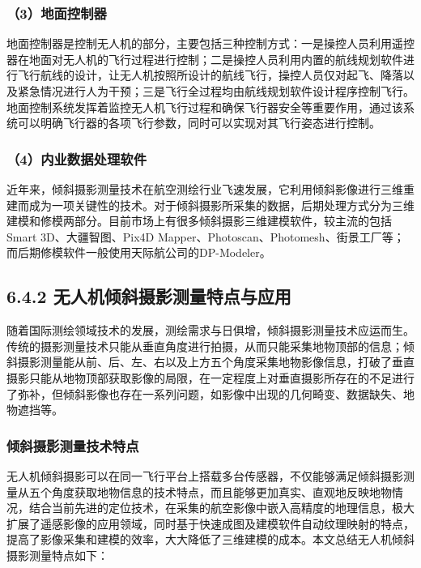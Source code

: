 \subsubsection{（3）地面控制器}\label{ux5730ux9762ux63a7ux5236ux5668}

地面控制器是控制无人机的部分，主要包括三种控制方式：一是操控人员利用遥控器在地面对无人机的飞行过程进行控制；二是操控人员利用内置的航线规划软件进行飞行航线的设计，让无人机按照所设计的航线飞行，操控人员仅对起飞、降落以及紧急情况进行人为干预；三是飞行全过程均由航线规划软件设计程序控制飞行。地面控制系统发挥着监控无人机飞行过程和确保飞行器安全等重要作用，通过该系统可以明确飞行器的各项飞行参数，同时可以实现对其飞行姿态进行控制。

\subsubsection{（4）内业数据处理软件}\label{ux5185ux4e1aux6570ux636eux5904ux7406ux8f6fux4ef6}

近年来，倾斜摄影测量技术在航空测绘行业飞速发展，它利用倾斜影像进行三维重建而成为一项关键性的技术。对于倾斜摄影所采集的数据，后期处理方式分为三维建模和修模两部分。目前市场上有很多倾斜摄影三维建模软件，较主流的包括Smart
3D、大疆智图、Pix4D
Mapper、Photoscan、Photomesh、街景工厂等；而后期修模软件一般使用天际航公司的DP-Modeler。

\subsection{6.4.2
无人机倾斜摄影测量特点与应用}\label{ux65e0ux4ebaux673aux503eux659cux6444ux5f71ux6d4bux91cfux7279ux70b9ux4e0eux5e94ux7528}

随着国际测绘领域技术的发展，测绘需求与日俱增，倾斜摄影测量技术应运而生。传统的摄影测量技术只能从垂直角度进行拍摄，从而只能采集地物顶部的信息；倾斜摄影测量能从前、后、左、右以及上方五个角度采集地物影像信息，打破了垂直摄影只能从地物顶部获取影像的局限，在一定程度上对垂直摄影所存在的不足进行了弥补，但倾斜影像也存在一系列问题，如影像中出现的几何畸变、数据缺失、地物遮挡等。

\subsubsection{倾斜摄影测量技术特点}\label{ux503eux659cux6444ux5f71ux6d4bux91cfux6280ux672fux7279ux70b9}

无人机倾斜摄影可以在同一飞行平台上搭载多台传感器，不仅能够满足倾斜摄影测量从五个角度获取地物信息的技术特点，而且能够更加真实、直观地反映地物情况，结合当前先进的定位技术，在采集的航空影像中嵌入高精度的地理信息，极大扩展了遥感影像的应用领域，同时基于快速成图及建模软件自动纹理映射的特点，提高了影像采集和建模的效率，大大降低了三维建模的成本。本文总结无人机倾斜摄影测量特点如下：

